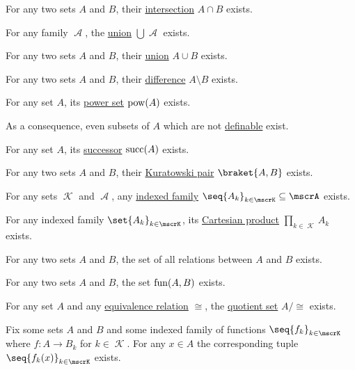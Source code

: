\begin{proposition}
\begin{thmenum}
     For any two sets \( A \) and \( B \), their \hyperref[def:basic_set_operations/intersection]{intersection} \( A \cap B \) exists.

     For any family \( \mscrA \), the \hyperref[def:basic_set_operations/union]{union} \( \bigcup \mscrA \) exists.

     For any two sets \( A \) and \( B \), their \hyperref[def:basic_set_operations/union]{union} \( A \cup B \) exists.

     For any two sets \( A \) and \( B \), their \hyperref[def:basic_set_operations/difference]{difference} \( A \setminus B \) exists.

     For any set \( A \), its \hyperref[def:basic_set_operations/power_set]{power set} \( \operatorname{pow}(A) \) exists.

    As a consequence, even subsets of \( A \) which are not \hyperref[def:first_order_definability]{definable} exist.

     For any set \( A \), its \hyperref[def:ordinal_successor]{successor} \( \operatorname{succ}(A) \) exists.

     For any two sets \( A \) and \( B \), their \hyperref[def:cartesian_product/kuratowski_pair]{Kuratowski pair} \( \braket{ A, B } \) exists.

     For any sets \( \mscrK \) and \( \mscrA \), any \hyperref[def:cartesian_product/indexed_family]{indexed family} \( \seq{ A_k }_{k \in \mscrK} \subseteq \mscrA \) exists.

     For any indexed family \( \set{ A_k }_{k \in \mscrK} \), its \hyperref[def:cartesian_product]{Cartesian product} \( \prod_{k \in \mscrK} A_k \) exists.

     For any two sets \( A \) and \( B \), the set of all relations between \( A \) and \( B \) exists.

     For any two sets \( A \) and \( B \), the set \hyperref[def:function/set_of_functions]{\( \operatorname{fun}(A, B) \)} exists.

     For any set \( A \) and any \hyperref[def:equivalence_relation]{equivalence relation} \( \cong \), the \hyperref[def:equivalence_relation/quotient]{quotient set} \( A / {\cong} \) exists.

     Fix some sets \( A \) and \( B \) and some indexed family of functions \( \seq{ f_k }_{k \in \mscrK} \) where \( f: A \to B_k \) for \( k \in \mscrK \). For any \( x \in A \) the corresponding tuple \( \seq{ f_k(x) }_{k \in \mscrK} \) exists.
  \end{thmenum}
\end{proposition}
